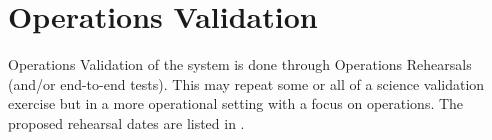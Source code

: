 \section{Operations Validation}

Operations Validation of the system is done through Operations Rehearsals (and/or end-to-end tests).
This may repeat some or all of a science validation exercise but in a more operational setting with a focus on operations. The proposed rehearsal dates are listed in .


